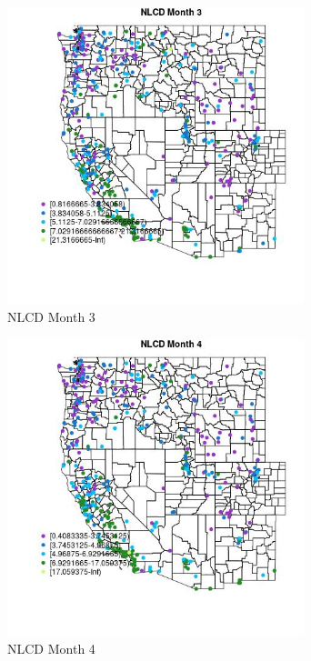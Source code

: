 \begin{figure} 
\centering  
\includegraphics[width=0.77\textwidth]{Code_Outputs/ML_input_report_ML_input_PM25_Step5_part_d_de_duplicated_aves_ML_input_MapObsMo3NLCD.jpg} 
\caption{\label{fig:ML_input_report_ML_input_PM25_Step5_part_d_de_duplicated_aves_ML_inputMapObsMo3NLCD}NLCD Month 3} 
\end{figure} 
 

\begin{figure} 
\centering  
\includegraphics[width=0.77\textwidth]{Code_Outputs/ML_input_report_ML_input_PM25_Step5_part_d_de_duplicated_aves_ML_input_MapObsMo4NLCD.jpg} 
\caption{\label{fig:ML_input_report_ML_input_PM25_Step5_part_d_de_duplicated_aves_ML_inputMapObsMo4NLCD}NLCD Month 4} 
\end{figure} 
 

